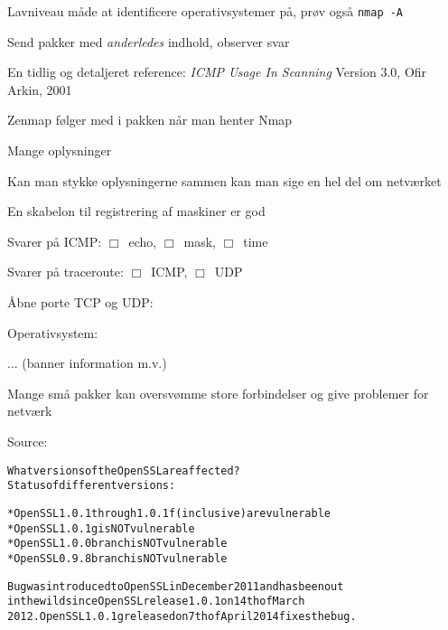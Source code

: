 \documentclass[20pt,landscape,a4paper,footrule]{foils}
\begin{document}
\begin{list2}
\item Lavniveau måde at identificere operativsystemer på, prøv også
  \verb+nmap -A+
\item Send pakker med \emph{anderledes} indhold, observer svar
\item En tidlig og detaljeret reference: \emph{ICMP Usage In Scanning} Version 3.0,
  Ofir Arkin, 2001 %
\end{list2}


\centerline{Zenmap følger med i pakken når man henter Nmap }


\begin{list1}
  \item Mange oplysninger
\item Kan man stykke oplysningerne sammen kan man sige en hel del om
  netværket
\item En skabelon til registrering af maskiner er god
  \begin{list2}
    \item Svarer på ICMP: $\Box$\  echo, $\Box$\ mask, $\Box$\ time
\item Svarer på traceroute: $\Box$\ ICMP, $\Box$\ UDP
\item Åbne porte TCP og UDP:
\item Operativsystem:
\item ... (banner information m.v.)
  \end{list2}
\item Mange små pakker kan oversvømme store forbindelser og
  give problemer for netværk
\end{list1}




Source: 


\begin{alltt}
What versions of the OpenSSL are affected?
Status of different versions:

* OpenSSL 1.0.1 through 1.0.1f (inclusive) are vulnerable
* OpenSSL 1.0.1g is NOT vulnerable
* OpenSSL 1.0.0 branch is NOT vulnerable
* OpenSSL 0.9.8 branch is NOT vulnerable

Bug was introduced to OpenSSL in December 2011 and has been out
in the wild since OpenSSL release 1.0.1 on 14th of March
2012. OpenSSL 1.0.1g released on 7th of April 2014 fixes the bug.
\end{alltt}
\end{document}
